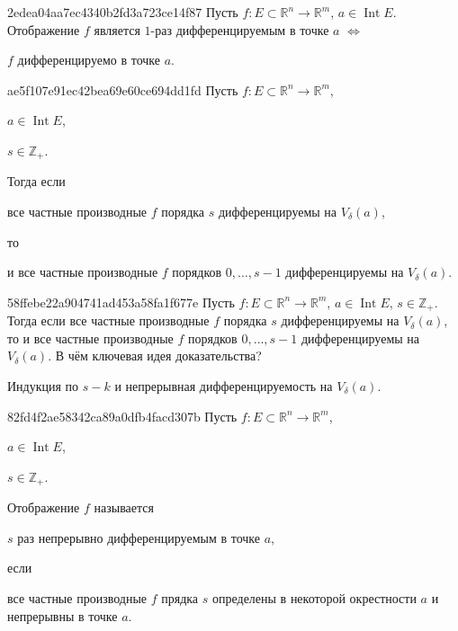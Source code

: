 \begin{note}{2edea04aa7ec4340b2fd3a723ce14f87}
    Пусть \({ f : E \subset \mathbb R^{n} \to \mathbb R^{m} }\),\: \({ a \in \operatorname{Int} E }\).
    Отображение \({ f }\) является  \({ 1 }\)-раз дифференцируемым в точке \({ a }\) \({ \iff }\) \begin{icloze}{1}\({ f }\) дифференцируемо в точке \({ a }\).\end{icloze}
\end{note}

\begin{note}{ae5f107e91ec42bea69e60ce694dd1fd}
    Пусть \({ f : E \subset \mathbb R^{n} \to \mathbb R^{m} }\),\: \begin{icloze}{4}\({ a \in \operatorname{Int} E }\),\end{icloze}\: \begin{icloze}{3}\({ s \in \mathbb Z_+ }\).\end{icloze}
    Тогда если \begin{icloze}{2}все частные производные \({ f }\) порядка \({ s }\) дифференцируемы на \({ V_\delta(a) }\),\end{icloze} то
    \begin{icloze}{1}
        и все частные производные \({ f }\) порядков \({ 0, \ldots, s - 1 }\) дифференцируемы на \({ V_\delta(a) }\).
    \end{icloze}
\end{note}

\begin{note}{58ffebe22a904741ad453a58fa1f677e}
    Пусть \({ f : E \subset \mathbb R^{n} \to \mathbb R^{m} }\),\: \({ a \in \operatorname{Int} E }\),\: \({ s \in \mathbb Z_+ }\).
    Тогда если все частные производные \({ f }\) порядка \({ s }\) дифференцируемы на \({ V_\delta(a) }\), то
    и все частные производные \({ f }\) порядков \({ 0, \ldots, s - 1 }\) дифференцируемы на \({ V_\delta(a) }\).
    В чём ключевая идея доказательства?

    \begin{cloze}{1}
        Индукция по \({ s - k }\) и непрерывная дифференцируемость на \({ V_\delta(a) }\).
    \end{cloze}
\end{note}

\begin{note}{82fd4f2ae58342ca89a0dfb4facd307b}
    Пусть \({  f : E \subset \mathbb R^{n} \to \mathbb R^{m} }\),\: \begin{icloze}{4}\({ a \in \operatorname{Int} E }\),\end{icloze}\: \begin{icloze}{3}\({ s \in \mathbb Z_+ }\).\end{icloze}
    Отображение \({ f }\) называется \begin{icloze}{2}\({ s }\) раз непрерывно дифференцируемым в точке \({ a }\),\end{icloze} если
    \begin{icloze}{1}
        все частные производные \({ f }\) прядка \({ s }\) определены в некоторой окрестности \({ a }\) и непрерывны в точке \({ a }\).
    \end{icloze}
\end{note}

